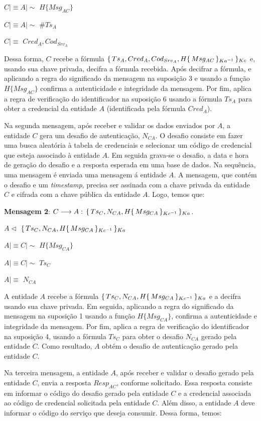 $C\mid\equiv A \mid\sim $  $H\{Msg_{AC}\}$

$C\mid\equiv A \mid\sim$ ${\#Ts_A}$

$C\mid\equiv$ ${Cred_A,Cod_{Srv_A}}$

Dessa forma, $C$ recebe a fórmula ${\{\,{Ts_A,Cred_A,Cod_{Srv_A},H{\{\,{Msg_{AC}}\,\}_{Ka ^{-1}}}}\,\}_{Kc}}$ e, usando sua chave privada, decifra a fórmula recebida.
Após decifrar a fórmula, e aplicando a regra do significado da mensagem na suposição 3 e usando a função $H \{Msg_{AC}\}$ confirma a autenticidade e integridade da mensagem.
Por fim, aplica a regra de verificação do identificador na suposição 6 usando a fórmula ${Ts_A}$ para obter a credencial da entidade ${A}$ (identificada pela fórmula ${Cred_A}$).

Na segunda mensagem, após receber e validar os dados enviados por $A$, a entidade ${C}$ gera um desafio de autenticação, ${N_{CA}}$. O desafio consiste em fazer uma busca aleatória à tabela de credenciais e selecionar um código de credencial que esteja associado \`{a} entidade $A$. Em seguida grava-se o desafio, a data e hora de geração do desafio e a resposta esperada em uma base de dados. Na sequência, uma mensagem \'{e} enviada uma mensagem \'{a} entidade $A$. A mensagem, que contém o desafio e um \emph{timestamp}, precisa ser assinada com a chave privada da entidade ${C}$ e cifrada com a chave pública da entidade ${A}$.
Logo, temos que:

\textbf{Mensagem 2}: ${C}\longrightarrow{A}:\,{\{\,{Ts_C,{N_{CA}},H{\{\,{Msg_{CA}}\,\}_{Kc ^{-1}}}}\,\}_{Ka}}$.

$A \triangleleft$ ${\{\,{Ts_C,{N_{CA}},H{\{\,{Msg_{CA}}\,\}_{Kc ^{-1}}}}\,\}_{Ka}}$

$A \mid\equiv C \mid\sim $  $H \{Msg_{CA}\}$

$A \mid\equiv C \mid\sim$ ${Ts_C}$

$A \mid\equiv$ ${N_{CA}}$

A entidade $A$ recebe a fórmula ${\{\,{Ts_C,{N_{CA}},H{\{\,{Msg_{CA}}\,\}_{Kc ^{-1}}}}\,\}_{Ka}}$ e a decifra usando sua chave privada. Em seguida, aplicando a regra do significado da mensagem na suposição 1 usando a função $H \{Msg_{CA}\}$, confirma a autenticidade e integridade da mensagem. Por fim, aplica a regra de verificação do identificador na suposição 4, usando a fórmula ${Ts_C}$ para obter o desafio ${N_{CA}}$ gerado pela entidade ${C}$. Como resultado, ${A}$ obtém  o desafio de autenticação gerado pela entidade ${C}$.

Na terceira mensagem, a entidade ${A}$, após receber e validar o desafio gerado pela entidade ${C}$, envia a resposta ${Resp_{AC}}$, conforme solicitado. Essa resposta consiste em informar o código do desafio gerado pela entidade ${C}$ e a credencial associada ao código de credencial solicitada pela entidade ${C}$. Além disso, a entidade ${A}$ deve informar o código do serviço que deseja consumir. Dessa forma, temos:

